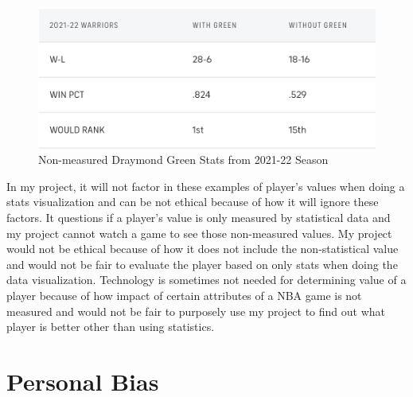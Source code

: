 \documentclass[10pt,twocolumn]{article}
\begin{document}
\begin{figure}
    \centering
    \includegraphics[width=.95\linewidth]{Green_stats.png}
    \caption{
       Non-measured Draymond Green Stats from 2021-22 Season
    }
    \label{fig:second-page}
\end{figure}

In my project, it will not factor in these examples of player's values when doing a stats visualization and can be not ethical because of how it will ignore these factors. It questions if a player's value is only measured by statistical data and my project cannot watch a game to see those non-measured values. My project would not be ethical because of how it does not include the non-statistical value and would not be fair to evaluate the player based on only stats when doing the data visualization. Technology is sometimes not needed for determining value of a player because of how impact of certain attributes of a NBA game is not measured and would not be fair to purposely use my project to find out what player is better other than using statistics. 

\section{Personal Bias}
\end{document}
